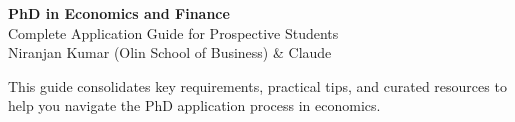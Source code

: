 \documentclass[11pt, letterpaper]{article}
\begin{document}
\color{cdarktext}

\begin{center}
\colorbox{cdark}{%
\begin{minipage}[c]{0.92\textwidth}
\vspace{14pt}
\centering
{\Huge\bfseries\color{white} PhD in Economics and Finance}\\[8pt]
{\large\color{cmedium} Complete Application Guide for Prospective Students}\\[10pt]
{\normalsize\color{white} Niranjan Kumar (Olin School of Business) \& Claude}
\vspace{14pt}
\end{minipage}%
}
\end{center}

\vspace{12pt}

This guide consolidates key requirements, practical tips, and curated resources to help you navigate the PhD application process in economics.

\vspace{10pt}
\end{document}
